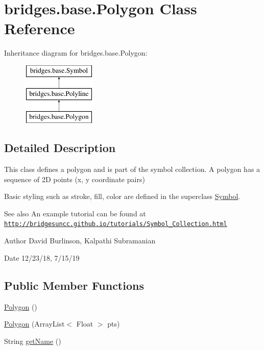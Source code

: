 \hypertarget{classbridges_1_1base_1_1_polygon}{}\section{bridges.\+base.\+Polygon Class Reference}
\label{classbridges_1_1base_1_1_polygon}
Inheritance diagram for bridges.\+base.\+Polygon\+:\begin{figure}[H]
\begin{center}
\leavevmode
\includegraphics[height=3.000000cm]{classbridges_1_1base_1_1_polygon}
\end{center}
\end{figure}


\subsection{Detailed Description}
This class defines a polygon and is part of the symbol collection. A polygon has a sequence of 2D points (x, y coordinate pairs) 

Basic styling such as stroke, fill, color are defined in the superclass \hyperlink{classbridges_1_1base_1_1_symbol}{Symbol}.

\begin{DoxySeeAlso}{See also}
An example tutorial can be found at \href{http://bridgesuncc.github.io/tutorials/Symbol_Collection.html}{\tt http\+://bridgesuncc.\+github.\+io/tutorials/\+Symbol\+\_\+\+Collection.\+html}
\end{DoxySeeAlso}
\begin{DoxyAuthor}{Author}
David Burlinson, Kalpathi Subramanian 
\end{DoxyAuthor}
\begin{DoxyDate}{Date}
12/23/18, 7/15/19 
\end{DoxyDate}
\subsection*{Public Member Functions}
\begin{DoxyCompactItemize}
\item 
\hyperlink{classbridges_1_1base_1_1_polygon_af0c1b3bc3147ffbda98fd9c515a8052d}{Polygon} ()
\item 
\hyperlink{classbridges_1_1base_1_1_polygon_a341cc297ba7f0f201d31aa3c98ecf108}{Polygon} (Array\+List$<$ Float $>$ pts)
\item 
String \hyperlink{classbridges_1_1base_1_1_polygon_a2203367acb1a26dfa1a81d69ce61274f}{get\+Name} ()
\end{DoxyCompactItemize}
